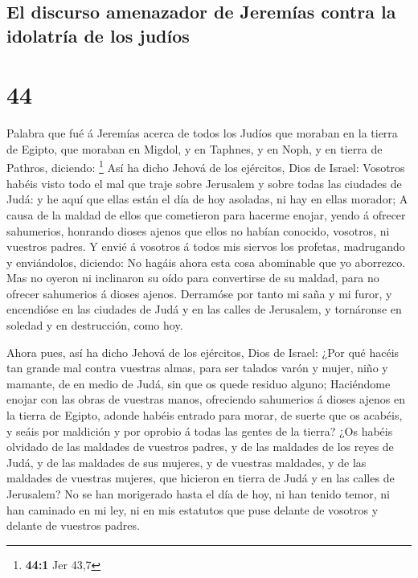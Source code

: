 \hypertarget{el-discurso-amenazador-de-jeremuxedas-contra-la-idolatruxeda-de-los-juduxedos}{%
\subsection{El discurso amenazador de Jeremías contra la idolatría de
los
judíos}\label{el-discurso-amenazador-de-jeremuxedas-contra-la-idolatruxeda-de-los-juduxedos}}

\hypertarget{section-43}{%
\section{44}\label{section-43}}

 Palabra que fué á Jeremías acerca de todos los Judíos que
moraban en la tierra de Egipto, que moraban en Migdol, y en Taphnes, y
en Noph, y en tierra de Pathros, diciendo: \footnote{\textbf{44:1} Jer
  43,7}  Así ha dicho Jehová de los ejércitos, Dios de
Israel: Vosotros habéis visto todo el mal que traje sobre Jerusalem y
sobre todas las ciudades de Judá: y he aquí que ellas están el día de
hoy asoladas, ni hay en ellas morador;  A causa de la
maldad de ellos que cometieron para hacerme enojar, yendo á ofrecer
sahumerios, honrando dioses ajenos que ellos no habían conocido,
vosotros, ni vuestros padres.  Y envié á vosotros á todos
mis siervos los profetas, madrugando y enviándolos, diciendo: No hagáis
ahora esta cosa abominable que yo aborrezco.  Mas no
oyeron ni inclinaron su oído para convertirse de su maldad, para no
ofrecer sahumerios á dioses ajenos.  Derramóse por tanto
mi saña y mi furor, y encendióse en las ciudades de Judá y en las calles
de Jerusalem, y tornáronse en soledad y en destrucción, como hoy.

 Ahora pues, así ha dicho Jehová de los ejércitos, Dios de
Israel: ¿Por qué hacéis tan grande mal contra vuestras almas, para ser
talados varón y mujer, niño y mamante, de en medio de Judá, sin que os
quede residuo alguno;  Haciéndome enojar con las obras de
vuestras manos, ofreciendo sahumerios á dioses ajenos en la tierra de
Egipto, adonde habéis entrado para morar, de suerte que os acabéis, y
seáis por maldición y por oprobio á todas las gentes de la tierra?
 ¿Os habéis olvidado de las maldades de vuestros padres, y
de las maldades de los reyes de Judá, y de las maldades de sus mujeres,
y de vuestras maldades, y de las maldades de vuestras mujeres, que
hicieron en tierra de Judá y en las calles de Jerusalem? 
No se han morigerado hasta el día de hoy, ni han tenido temor, ni han
caminado en mi ley, ni en mis estatutos que puse delante de vosotros y
delante de vuestros padres.


